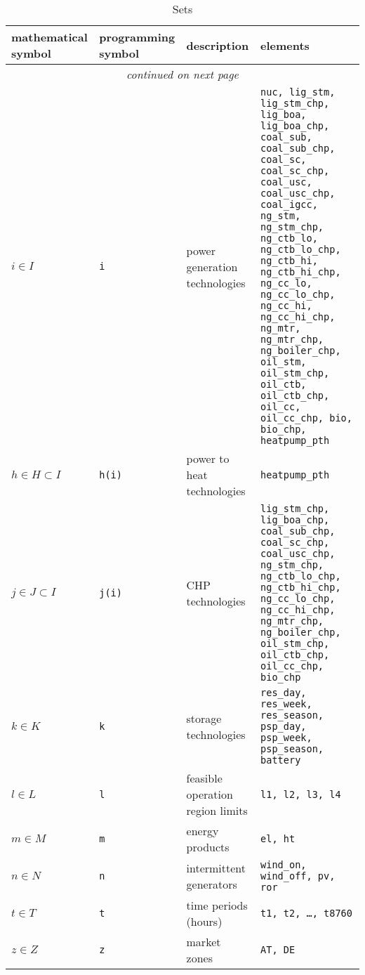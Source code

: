 \documentclass[review, 3p, times, 12pt]{elsarticle} %
\begin{document}
\begin{longtable}{p{}p{}p{}p{}}%
\caption{Sets}\\
\toprule
mathematical symbol & programming symbol & description & elements\\
\midrule
\endhead
\bottomrule
\multicolumn{4}{c}{\textit{continued on next page}} \endfoot
\bottomrule
\endlastfoot
$f \in F$            &\texttt{f}      & fuels & \texttt{nuclear, lignite, coal, gas, oil, biomass, power} \\
$i \in I$            &\texttt{i}      & power generation technologies & \texttt{nuc, lig\_stm, lig\_stm\_chp, lig\_boa, lig\_boa\_chp, coal\_sub, coal\_sub\_chp, coal\_sc, coal\_sc\_chp, coal\_usc, coal\_usc\_chp, coal\_igcc, ng\_stm, ng\_stm\_chp, ng\_ctb\_lo, ng\_ctb\_lo\_chp, ng\_ctb\_hi, ng\_ctb\_hi\_chp, ng\_cc\_lo, ng\_cc\_lo\_chp, ng\_cc\_hi, ng\_cc\_hi\_chp, ng\_mtr, ng\_mtr\_chp, ng\_boiler\_chp, oil\_stm, oil\_stm\_chp, oil\_ctb, oil\_ctb\_chp, oil\_cc, oil\_cc\_chp, bio, bio\_chp, heatpump\_pth}                                 \\
$h \in H \subset I$  &\texttt{h(i)}   & power to heat technologies & \texttt{heatpump\_pth} \\
$j \in J \subset I$  &\texttt{j(i)}   & CHP technologies & \texttt{lig\_stm\_chp, lig\_boa\_chp, coal\_sub\_chp, coal\_sc\_chp, coal\_usc\_chp, ng\_stm\_chp, ng\_ctb\_lo\_chp, ng\_ctb\_hi\_chp, ng\_cc\_lo\_chp, ng\_cc\_hi\_chp, ng\_mtr\_chp, ng\_boiler\_chp, oil\_stm\_chp, oil\_ctb\_chp, oil\_cc\_chp, bio\_chp} \\
$k \in K$            &\texttt{k}      & storage technologies & \texttt{res\_day, res\_week, res\_season, psp\_day, psp\_week, psp\_season, battery} \\
$l \in L$            &\texttt{l}      & feasible operation region limits & \texttt{l1, l2, l3, l4}\\
$m \in M$            &\texttt{m}      & energy products & \texttt{el, ht} \\
$n \in N$            &\texttt{n}      & intermittent generators & \texttt{wind\_on, wind\_off, pv, ror} \\
$t \in T$            &\texttt{t}      & time periods (hours)               & \texttt{t1, t2, \ldots, t8760}\\
$z \in Z$            &\texttt{z}      & market zones & \texttt{AT, DE} \\
\end{longtable}
\end{document}
